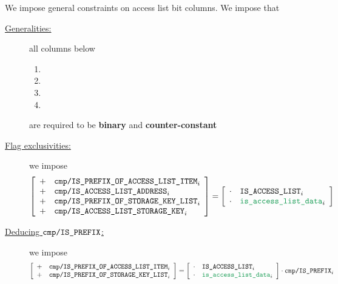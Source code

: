 \begin{center}
\end{center}
We impose general constraints on access list bit columns.
We impose that
\begin{description}
    \item[\underline{Generalities:}]
	all columns below
	\begin{multicols}{2}
	    \begin{enumerate}
		\item
		    \rlpTxnComputationColumnIsPrefixOfAccessListItem
		\item
		    \rlpTxnComputationColumnIsAccessListAddress
		\item
		    \rlpTxnComputationColumnIsPrefixOfStorageKeyList
		\item
		    \rlpTxnComputationColumnIsAccessListStorageKey
	    \end{enumerate}
	\end{multicols}
	are required to be \textbf{binary} and \textbf{counter-constant}
    \item[\underline{Flag exclusivities:}]
	we impose
	\[
	    \left[ \begin{array}{cl}
		+ & \rlpTxnComputationColumnIsPrefixOfAccessListItem _{i} \\
		+ & \rlpTxnComputationColumnIsAccessListAddress      _{i} \\
		+ & \rlpTxnComputationColumnIsPrefixOfStorageKeyList _{i} \\
		+ & \rlpTxnComputationColumnIsAccessListStorageKey   _{i} \\
	    \end{array} \right]
	    = 
	    \left[ \begin{array}{cl}
		\cdot & \phaseAccessList   _{i} \\
		\cdot & \locAccessListData _{i} \\
	    \end{array} \right]
	\]
    \item[\underline{Deducing $\texttt{cmp}\texttt{/}\texttt{{\texttt{IS\_PREFIX}}}$:}]
	we impose
	\[
	    \left[ \begin{array}{cl}
		+ & \rlpTxnComputationColumnIsPrefixOfAccessListItem _{i} \\
		+ & \rlpTxnComputationColumnIsPrefixOfStorageKeyList _{i} \\
	    \end{array} \right]
	    =
	    \left[ \begin{array}{cl}
		\cdot & \phaseAccessList                 _{i} \\
		\cdot & \locAccessListData               _{i} \\
	    \end{array} \right]
	    \cdot
	    \rlpTxnComputationColumnIsPrefix _{i}
	\]
\end{description}
